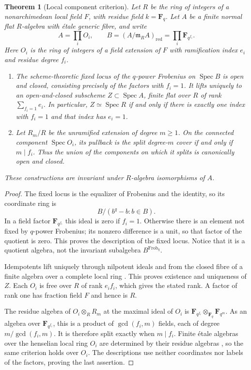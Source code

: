 \documentclass[11pt]{amsart}
\newtheorem{theorem}{Theorem}[section]
\theoremstyle{definition}
\theoremstyle{remark}
\newcommand{\FF}{\mathbf F}
\begin{document}
\begin{theorem}[Local component criterion]
\label{thm:frobenius-criterion}
Let $R$ be the ring of integers of a nonarchimedean local field $F$, with
residue field $k=\FF_q$.  Let $A$ be a finite normal flat $R$-algebra with
\'etale generic fibre, and write
\[
 A=\prod_i O_i,\qquad
 B=(A/\mathfrak m_R A)_{\mathrm{red}}=\prod_i\FF_{q^{f_i}}.
\]
Here $O_i$ is the ring of integers of a field extension of $F$ with
ramification index $e_i$ and residue degree $f_i$.
\begin{enumerate}
\item The scheme-theoretic fixed locus of the $q$-power Frobenius on
$\operatorname{Spec}B$ is open and closed, consisting precisely of the
factors with $f_i=1$.  It lifts uniquely to an open-and-closed subscheme
$Z\subset\operatorname{Spec}A$, finite flat over $R$ of rank
$\sum_{f_i=1}e_i$.  In particular, $Z\simeq\operatorname{Spec}R$ if and only
if there is exactly one index with $f_i=1$ and that index has $e_i=1$.
\item Let $R_m/R$ be the unramified extension of degree $m\geq1$.  On the
connected component $\operatorname{Spec}O_i$, its pullback is the split
degree-$m$ cover if and only if $m\mid f_i$.  Thus the union of the
components on which it splits is canonically open and closed.
\end{enumerate}
These constructions are invariant under $R$-algebra isomorphisms of $A$.
\end{theorem}

\begin{proof}
The fixed locus is the equalizer of Frobenius and the identity, so its
coordinate ring is
\[
 B/(b^q-b:b\in B).
\]
In a field factor $\FF_{q^{f_i}}$ this ideal is zero if $f_i=1$.
Otherwise there is an element not fixed by $q$-power Frobenius; its
nonzero difference is a unit, so that factor of the quotient is zero.
This proves the description of the fixed locus.  Notice that it is a
quotient algebra, not the invariant subalgebra $B^{\mathrm{Frob}_q}$.

Idempotents lift uniquely through nilpotent ideals and from the closed
fibre of a finite algebra over a complete local ring
\cite[Tags 09XD and 04GK]{Stacks}.  This proves existence and uniqueness
of $Z$.  Each $O_i$ is free over $R$ of rank $e_i f_i$, which gives the
stated rank.  A factor of rank one has fraction field $F$ and hence is $R$.

The residue algebra of $O_i\otimes_R R_m$ at the maximal ideal of $O_i$ is
$\FF_{q^{f_i}}\otimes_{\FF_q}\FF_{q^m}$.  As an algebra over
$\FF_{q^{f_i}}$, this is a product of $\gcd(f_i,m)$ fields, each of degree
$m/\gcd(f_i,m)$.  It is therefore split exactly when $m\mid f_i$.
Finite \'etale algebras over the henselian local ring $O_i$ are determined
by their residue algebras \cite[Tag 04GK]{Stacks}, so the same criterion
holds over $O_i$.  The descriptions use neither coordinates nor labels of
the factors, proving the last assertion.
\end{proof}
\end{document}
